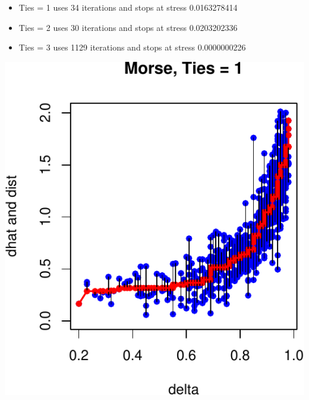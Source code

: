 \documentclass[
  12pt,
]{article}
\providecommand{\tightlist}{%
  \setlength{\itemsep}{0pt}\setlength{\parskip}{0pt}}
\begin{document}
\begin{itemize}
\tightlist
\item
  Ties = 1 uses 34 iterations and stops at stress 0.0163278414
\item
  Ties = 2 uses 30 iterations and stops at stress 0.0203202336
\item
  Ties = 3 uses 1129 iterations and stops at stress 0.0000000226
\end{itemize}

\begin{center}\includegraphics{smacofRO_files/figure-latex/plotmorse-1} \end{center}
\end{document}

